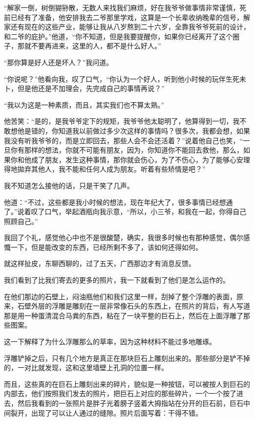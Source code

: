 “解家一倒，树倒猢狲散，无数人来找我们麻烦，好在我爷爷做事情非常谨慎，死前已经有了准备，他安排我去二爷那里学戏，这算是一个长辈收纳晚辈的信号，解家还有现在的这些产业，能够让我从八岁熬到二十六岁，全靠我爷爷死前的设计，和二爷的庇护。”他道，“你不知道，但是我要提醒你，如果你已经离开了这个圈子，那就不要再进来，这里的人，都不是什么好人。”

“那你算是好人还是坏人？”我问道。

“你说呢？”他看向我，叹了口气，“你认为一个好人，听到他小时候的玩伴生死未卜，但是他还是不加理会，先完成自己的事情再说？”

“我以为这是一种素质，而且，其实我们也不算太熟。”

他苦笑：“是的，是我爷爷定下的规矩，我爷爷他太聪明了，他算得到一切，我不敢想他是错的，你知道我以前做过多少次这样的事情吗？很多次，我都会想，如果我没有听我爷爷的，而是立即回去，那些人会不会还活着？”说着他自己也笑，“一旦你有那样的想法，你就不可能有朋友，因为，你知道你不能回去救他，那么，如果你和他成了朋友，发生这种事情，那你就会伤心，为了不伤心，为了能够心安理得地拋弃其他人，我不能和任何人成为朋友。听着有些矫情是吧？”

我不知道怎么接他的话，只是干笑了几声。

他道：“不过，这些都是我小时候的想法，现在年纪大了，很多事情已经想通了。”说着叹了口气，举起酒瓶向我示意，“所以，小三爷，和我在一起，你得自己照顾自己。”

我回了个礼，感觉他心中也不是很酸楚，确实，我很多时候也有那种感觉，偶尔感慨一下，但是能改变的东西，已经所剩不多了，该如何还得如何。

就这样扯皮，东聊西聊的，过了五天，广西那边才有消息反馈。

我们看到了比我们寄去的更多的照片，我一下就看到了他们是怎么运作的。

在他们那边的石壁上，闷油瓶他们和我们这里一样，刮掉了整个浮雕的表面，原来，石壁外层的浮雕是雕刻在一层非常像石头的东西上，在照片的背后，有人写道那是用一种蛋清混合马粪的东西，粘在了一块平整的巨石上，然后在上面浮雕了那些图案。

这一下解释了为什么浮雕那么的草率，因为这种材料不能过多地雕琢。

浮雕铲掉之后，只有几个地方是真正在那块巨石上雕刻出来的。那些部分是铲不掉的，一对比就发现，这和这里墙壁上孔洞的位置一样。

而且，这些真的在巨石上雕刻出来的碎片，貌似是一种按钮，可以被按人到巨石的内部去，他们按照我们发去的照片，把巨石上对应的那些碎片，一个一个按了进去，然后我看到的一张照片是胖子光着膀子竖着大拇指站在分开的巨石前，巨石中间裂开，出现了可以让人通过的缝隙。照片后面写着：干得不错。

